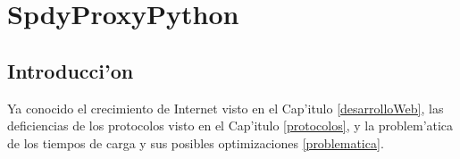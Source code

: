 \chapter{SpdyProxyPython}
\label{spdyproxypython}

\section{Introducci'on}

Ya conocido el crecimiento de Internet visto en el Cap'itulo \ref{desarrolloWeb}, las deficiencias de los protocolos visto en el Cap'itulo \ref{protocolos}, y la problem'atica de los tiempos de carga y sus posibles optimizaciones \ref{problematica}.
